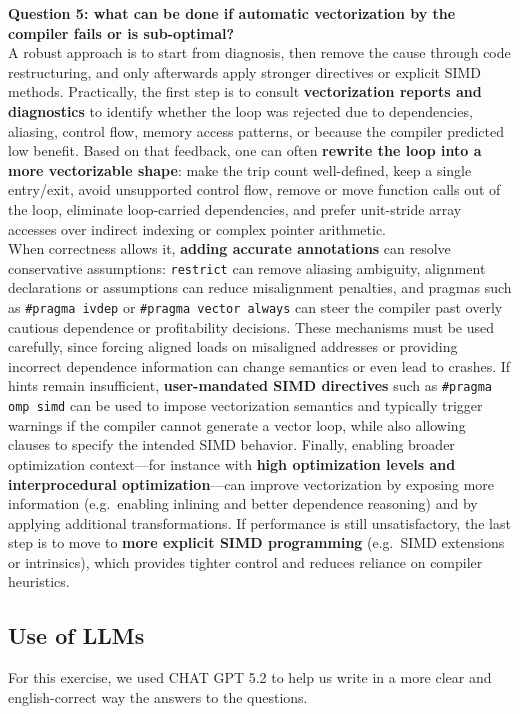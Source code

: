 \documentclass[unicode,10pt,a4paper,oneside,numbers=endperiod,openany]{scrartcl}
\begin{document}
\textbf{Question 5: what can be done if automatic vectorization by the compiler fails or is sub-optimal?}\\
A robust approach is to start from diagnosis, then remove the cause through code restructuring, and only afterwards apply stronger directives or explicit SIMD methods. Practically, the first step is to consult \textbf{vectorization reports and diagnostics} to identify whether the loop was rejected due to dependencies, aliasing, control flow, memory access patterns, or because the compiler predicted low benefit. Based on that feedback, one can often \textbf{rewrite the loop into a more vectorizable shape}: make the trip count well-defined, keep a single entry/exit, avoid unsupported control flow, remove or move function calls out of the loop, eliminate loop-carried dependencies, and prefer unit-stride array accesses over indirect indexing or complex pointer arithmetic.\\
When correctness allows it, \textbf{adding accurate annotations} can resolve conservative assumptions: \texttt{restrict} can remove aliasing ambiguity, alignment declarations or assumptions can reduce misalignment penalties, and pragmas such as \texttt{\#pragma ivdep} or \texttt{\#pragma vector always} can steer the compiler past overly cautious dependence or profitability decisions. These mechanisms must be used carefully, since forcing aligned loads on misaligned addresses or providing incorrect dependence information can change semantics or even lead to crashes. If hints remain insufficient, \textbf{user-mandated SIMD directives} such as \texttt{\#pragma omp simd} can be used to impose vectorization semantics and typically trigger warnings if the compiler cannot generate a vector loop, while also allowing clauses to specify the intended SIMD behavior. Finally, enabling broader optimization context---for instance with \textbf{high optimization levels and interprocedural optimization}---can improve vectorization by exposing more information (e.g.\ enabling inlining and better dependence reasoning) and by applying additional transformations. If performance is still unsatisfactory, the last step is to move to \textbf{more explicit SIMD programming} (e.g.\ SIMD extensions or intrinsics), which provides tighter control and reduces reliance on compiler heuristics.
\subsection{Use of LLMs}
For this exercise, we used CHAT GPT 5.2 to help us write in a more clear and english-correct way the answers to the questions.\\
\newpage
\end{document}
